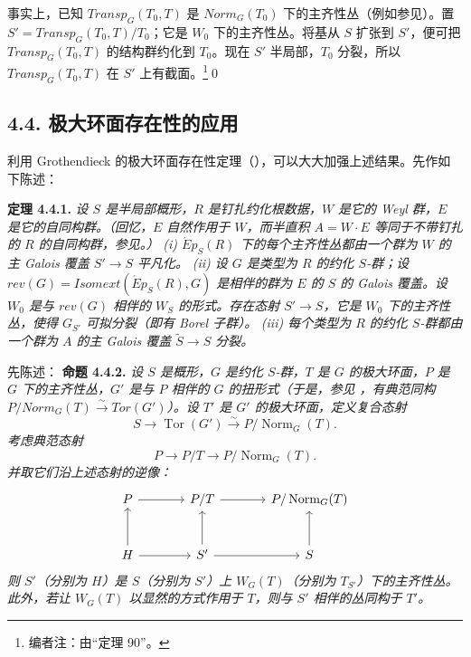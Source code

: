 事实上，已知 \(Transp_{G}(T_{0}, T)\) 是 \(Norm_{G}(T_{0})\) 下的主齐性丛（例如参见）。置 \(S' = Transp_{G}(T_{0}, T) / T_{0}\)；它是 \(W_0\) 下的主齐性丛。将基从 \(S\) 扩张到 \(S'\)，便可把 \(Transp_{G}(T_{0}, T)\) 的结构群约化到 \(T_0\)。现在 \(S'\) 半局部，\(T_0\) 分裂，所以 \(Transp_{G}(T_{0}, T)\) 在 \(S'\) 上有截面。\footnote{编者注：由“定理 90”。}\qed

\subsection*{4.4. 极大环面存在性的应用}
利用 Grothendieck 的极大环面存在性定理（），可以大大加强上述结果。先作如下陈述：

\textbf{定理 4.4.1.} \emph{设 \(S\) 是半局部概形，\(R\) 是钉扎约化根数据，\(W\) 是它的 Weyl 群，\(E\) 是它的自同构群。（回忆，\(E\) 自然作用于 \(W\)，而半直积 \(A = W \cdot E\) 等同于不带钉扎的 \(R\) 的自同构群，参见。）}
\emph{(i) \(\acute{E}p_{S}(R)\) 下的每个主齐性丛都由一个群为 \(W\) 的主 Galois 覆盖 \(S' \to S\) 平凡化。}
\emph{(ii) 设 \(G\) 是类型为 \(R\) 的约化 \(S\)-群；设 \(rev(G) = Isomext(\acute{E}p_{S}(R), G)\) 是相伴的群为 \(E\) 的 \(S\) 的 Galois 覆盖。设 \(W_0\) 是与 \(rev(G)\) 相伴的 \(W_S\) 的形式。存在态射 \(S' \to S\)，它是 \(W_0\) 下的主齐性丛，使得 \(G_{S'}\) 可拟分裂（即有 Borel 子群）。}
\emph{(iii) 每个类型为 \(R\) 的约化 \(S\)-群都由一个群为 \(A\) 的主 Galois 覆盖 \(\tilde{S} \to S\) 分裂。}

先陈述：
\textbf{命题 4.4.2.} \emph{设 \(S\) 是概形，\(G\) 是约化 \(S\)-群，\(T\) 是 \(G\) 的极大环面，\(P\) 是 \(G\) 下的主齐性丛，\(G'\) 是与 \(P\) 相伴的 \(G\) 的扭形式（于是，参见 ，有典范同构 \(P / Norm_{G}(T) \xrightarrow{\sim} Tor(G')\)）。设 \(T'\) 是 \(G'\) 的极大环面，定义复合态射}
\[
  S\longrightarrow\operatorname{Tor}(G')
  \xrightarrow{\sim}P/\operatorname{Norm}_G(T).
\]
\emph{考虑典范态射}
\[
  P\longrightarrow P/T\longrightarrow P/\operatorname{Norm}_G(T).
\]
\emph{并取它们沿上述态射的逆像：}
\[
\begin{tikzcd}[column sep=large,row sep=large]
P \arrow[r]
&
P/T \arrow[r]
&
P/\operatorname{Norm}_G(T)
\\
H \arrow[u] \arrow[r]
&
S' \arrow[u] \arrow[r]
&
S \arrow[u]
\end{tikzcd}
\]
\emph{则 \(S'\)（分别为 \(H\)）是 \(S\)（分别为 \(S'\)）上 \(W_{G}(T)\)（分别为 \(T_{S'}\)）下的主齐性丛。此外，若让 \(W_{G}(T)\) 以显然的方式作用于 \(T\)，则与 \(S'\) 相伴的丛同构于 \(T'\)。}

